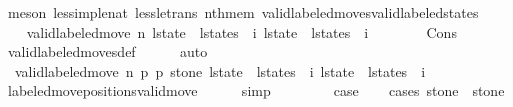 \begin{isabellebody}
\ {\isacharparenleft}meson\ less{\isacharunderscore}imp{\isacharunderscore}le{\isacharunderscore}nat\ less{\isacharunderscore}le{\isacharunderscore}trans\ nth{\isacharunderscore}mem\ valid{\isacharunderscore}labeled{\isacharunderscore}moves{\isacharunderscore}valid{\isacharunderscore}labeled{\isacharunderscore}states{\isacharparenright}\isanewline
\isanewline
\ \ \isamarkupfalse%
\isanewline
\isanewline
\ \ \isamarkupfalse%
\ {\isachardoublequoteopen}valid{\isacharunderscore}labeled{\isacharunderscore}move\ n\ {\isacharparenleft}{\isacharparenleft}l{\isacharunderscore}state\ {\isacharhash}\ l{\isacharunderscore}states{\isacharparenright}\ {\isacharbang}\ i{\isacharparenright}\ {\isacharparenleft}{\isacharparenleft}l{\isacharunderscore}state\ {\isacharhash}\ l{\isacharunderscore}states{\isacharparenright}\ {\isacharbang}\ {\isacharparenleft}i\ {\isacharplus}\ {}{\isacharparenright}{\isacharparenright}{\isachardoublequoteclose}\isanewline
\ \ \ \ \isamarkupfalse%
\ Cons{\isacharparenleft}{}{\isacharminus}{}{\isacharparenright}\isanewline
\ \ \ \ \isamarkupfalse%
\ valid{\isacharunderscore}labeled{\isacharunderscore}moves{\isacharunderscore}def\isanewline
\ \ \ \ \isamarkupfalse%
\ auto\isanewline
\isanewline
\ \ \isamarkupfalse%
\isanewline
\isanewline
\ \ \isamarkupfalse%
\ {\isacharasterisk}{\isacharasterisk}{\isacharcolon}\ {\isachardoublequoteopen}valid{\isacharunderscore}labeled{\isacharunderscore}move{\isacharprime}\ n\ p{}\ p{}\ stone{\isacharprime}\ {\isacharparenleft}{\isacharparenleft}l{\isacharunderscore}state\ {\isacharhash}\ l{\isacharunderscore}states{\isacharparenright}\ {\isacharbang}\ i{\isacharparenright}\ {\isacharparenleft}{\isacharparenleft}l{\isacharunderscore}state\ {\isacharhash}\ l{\isacharunderscore}states{\isacharparenright}\ {\isacharbang}\ {\isacharparenleft}i\ {\isacharplus}\ {}{\isacharparenright}{\isacharparenright}{\isachardoublequoteclose}\isanewline
\ \ \ \ \isamarkupfalse%
\ labeled{\isacharunderscore}move{\isacharunderscore}positions{\isacharunderscore}valid{\isacharunderscore}move{\isacharprime}\isanewline
\ \ \ \ \isamarkupfalse%
\ simp\isanewline
\ \ \ \ \isanewline
\ \ \isamarkupfalse%
\ {\isacharquery}case\isanewline
\ \ \isamarkupfalse%
\ {\isacharparenleft}cases\ {\isachardoublequoteopen}stone{\isacharprime}\ {\isacharequal}\ stone{\isachardoublequoteclose}{\isacharparenright}\isanewline

\end{isabellebody}
